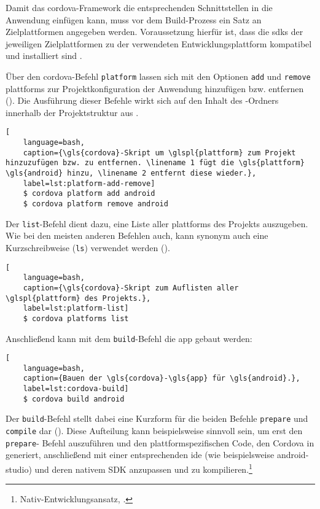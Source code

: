 {Damit das \gls{cordova}-Framework die entsprechenden Schnittstellen in die Anwendung einfügen kann, muss vor dem Build-Prozess ein Satz an Zielplattformen angegeben werden. 
Voraussetzung hierfür ist, dass die \glspl{sdk} der jeweiligen Zielplattformen zu der verwendeten Entwicklungsplattform kompatibel und installiert sind \cite{Cordova-Docs_CLI}.

Über den \gls{cordova}-Befehl \lstinline|platform| lassen sich mit den Optionen \lstinline|add| und \lstinline|remove| \glspl{plattform} zur Projektkonfiguration der Anwendung hinzufügen bzw. entfernen ().
Die Ausführung dieser Befehle wirkt sich auf den Inhalt des -Ordners innerhalb der Projektstruktur aus \cite{Cordova-Docs_CLI}.

\begin{lstlisting}[
	language=bash,
	caption={\gls{cordova}-Skript um \glspl{plattform} zum Projekt hinzuzufügen bzw. zu entfernen. \linename 1 fügt die \gls{plattform} \gls{android} hinzu, \linename 2 entfernt diese wieder.},
	label=lst:platform-add-remove]
	$ cordova platform add android
	$ cordova platform remove android
\end{lstlisting}


Der \lstinline|list|-Befehl dient dazu, eine Liste aller \glspl{plattform} des Projekts auszugeben. Wie bei den meisten anderen Befehlen auch, kann synonym auch eine Kurzschreibweise (\lstinline|ls|) verwendet werden ().


\begin{lstlisting}[
	language=bash,
	caption={\gls{cordova}-Skript zum Auflisten aller \glspl{plattform} des Projekts.},
	label=lst:platform-list]
	$ cordova platforms list
\end{lstlisting}



Anschließend kann mit dem \lstinline|build|-Befehl die \gls{app} gebaut werden:
\begin{lstlisting}[
	language=bash,
	caption={Bauen der \gls{cordova}-\gls{app} für \gls{android}.},
	label=lst:cordova-build]
	$ cordova build android
\end{lstlisting}


Der \lstinline|build|-Befehl stellt dabei eine Kurzform für die beiden Befehle \lstinline|prepare| und  \lstinline|compile| dar ().
Diese Aufteilung kann beispielsweise sinnvoll sein, um erst den \lstinline|prepare|- Befehl auszuführen und den plattformspezifischen Code, den Cordova in  generiert, anschließend mit einer entsprechenden \gls{ide} (wie beispielsweise \gls{android-studio}) und deren nativem SDK anzupassen und zu kompilieren.\footnote{\vgl Nativ-Entwicklungsansatz, \so.}


}
